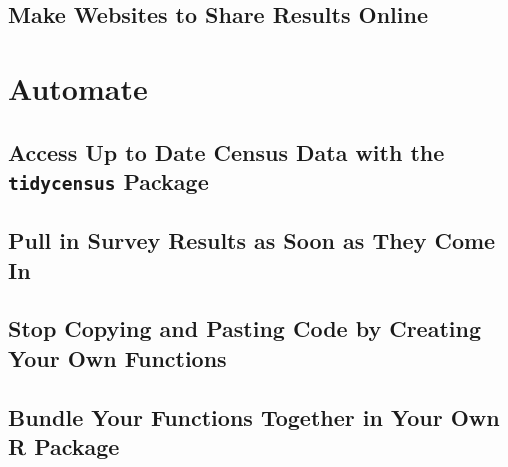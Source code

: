 \documentclass[
]{book}
\begin{document}
\hypertarget{make-websites-to-share-results-online}{%
\chapter*{Make Websites to Share Results Online}\label{make-websites-to-share-results-online}}

\hypertarget{part-automate}{%
\part*{Automate}\label{part-automate}}

\hypertarget{access-up-to-date-census-data-with-the-tidycensus-package}{%
\chapter*{\texorpdfstring{Access Up to Date Census Data with the \texttt{tidycensus} Package}{Access Up to Date Census Data with the tidycensus Package}}\label{access-up-to-date-census-data-with-the-tidycensus-package}}

\hypertarget{pull-in-survey-results-as-soon-as-they-come-in}{%
\chapter*{Pull in Survey Results as Soon as They Come In}\label{pull-in-survey-results-as-soon-as-they-come-in}}

\hypertarget{stop-copying-and-pasting-code-by-creating-your-own-functions}{%
\chapter*{Stop Copying and Pasting Code by Creating Your Own Functions}\label{stop-copying-and-pasting-code-by-creating-your-own-functions}}

\hypertarget{bundle-your-functions-together-in-your-own-r-package}{%
\chapter*{Bundle Your Functions Together in Your Own R Package}\label{bundle-your-functions-together-in-your-own-r-package}}
\end{document}

